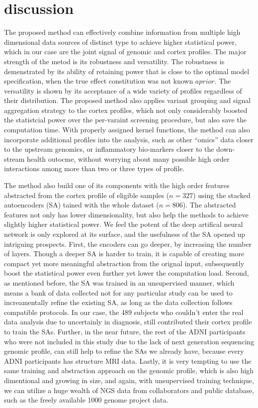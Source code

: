 \section{discussion}
The proposed method can effectively combine information from multiple high dimensional data sources of distinct type to achieve higher statistical power, which in our case are the joint signal of genomic and cortex profiles. The major strength of the metod is its robustness and versatility. The robustness is demenstrated by its ability of retaining power that is close to the optimal model specification, when the true effect constitution was not known $a prior$. The versatility is shown by its acceptance of a wide variety of profiles regardless of their distribution. The proposed method also applies variant grouping and signal aggregation strategy to the cortex profiles, which not only considerably boosted the statistcial power over the per-varaint screening procedure, but also save the computation time. With properly assigned kernel functions, the method can also incorporate additional profiles into the analysis, such as other ``omics'' data closer to the upstream genomics, or inflammatory bio-markers closer to the down-stream health outocme, without worrying about many possible high order interactions among more than two or three types of profile.

The method also build one of its components with the high order features abstracted from the cortex profile of eligible samples ($n=327$) using the stacked autoencoders (SA) tained with the whole dataset ($n=806$). The abstracted features not only has lower dimensionality, but also help the methods to achieve slightly higher statistical power. We feel the potent of the deep artifical neural network is only explored at its surface, and the usefulness of the SA opened up intriguing prospects. First, the encoders can go deeper, by increasing the number of layers. Though a deeper SA is harder to train, it is capable of creating more compact yet more meaningful abstraction from the orignal input, subsequently boost the statistical power even further yet lower the computation load. Second, as mentioned before, the SA was trained in an unsupervised manner, which means a bank of data collected not for any particular study can be used to increamentally refine the existing SA, as long as the data collection follows compatible protocols. In our case, the 489 subjects who couldn't enter the real data analysis due to uncertainly in diagnosis, still contributed their cortex profile to train the SAs. Further, in the near future, the rest of the ADNI participants who were not included in this study due to the lack of next generation sequencing genomic profile, can still help to refine the SAs we already have, because every ADNI participants has structure MRI data. Lastly, it is very tempting to use the same training and abstraction approach on the genomic profile, which is also high dimentional and growing in size, and again, with unsupervised training technique, we can utilize a huge wealth of NGS data from collaborators and public database, such as the freely available 1000 genome project data.

